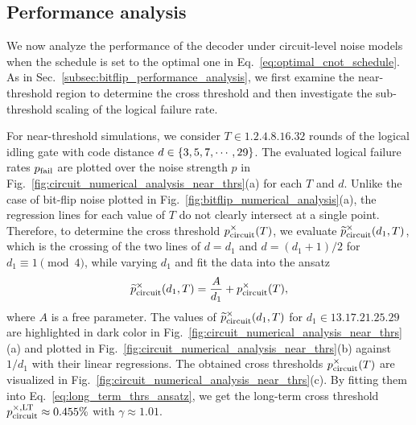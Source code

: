 \documentclass[a4paper,twocolumn,11pt,accepted=2025-01-21]{quantumarticle}
\theoremstyle{definition}
\theoremstyle{definition}
\theoremstyle{definition}
\begin{document}
\subsection{Performance analysis}

We now analyze the performance of the decoder under circuit-level noise models when the \cnot schedule is set to the optimal one in Eq.~\eqref{eq:optimal_cnot_schedule}.
As in Sec.~\ref{subsec:bitflip_performance_analysis}, we first examine the near-threshold region to determine the cross threshold and then investigate the sub-threshold scaling of the logical failure rate.

For near-threshold simulations, we consider $T \in \qty{1, 2, 4, 8, 16, 32}$ rounds of the logical idling gate with code distance $d \in \qty{3, 5, 7, \cdots, 29}$.
The evaluated logical failure rates $p_{\mathrm{fail}}$ are plotted over the noise strength $p$ in Fig.~\ref{fig:circuit_numerical_analysis_near_thrs}(a) for each $T$ and $d$.
Unlike the case of bit-flip noise plotted in Fig.~\ref{fig:bitflip_numerical_analysis}(a), the regression lines for each value of $T$ do not clearly intersect at a single point.
Therefore, to determine the cross threshold $p^\times_{\mathrm{circuit}}(T)$, we evaluate $\widetilde{p}^\times_{\mathrm{circuit}} (d_1, T)$, which is the crossing of the two lines of $d = d_1$ and $d = (d_1 + 1)/2$ for $d_1 \equiv 1 \pmod{4}$, while varying $d_1$ and fit the data into the ansatz
\begin{align*}
    \widetilde{p}^\times_{\mathrm{circuit}} (d_1, T) = \frac{A}{d_1} + p^\times_{\mathrm{circuit}}(T),
\end{align*}
where $A$ is a free parameter.
The values of $\widetilde{p}^\times_{\mathrm{circuit}} (d_1, T)$ for $d_1 \in \qty{13, 17, 21, 25, 29}$ are highlighted in dark color in Fig.~\ref{fig:circuit_numerical_analysis_near_thrs}(a) and plotted in Fig.~\ref{fig:circuit_numerical_analysis_near_thrs}(b) against $1/d_1$ with their linear regressions.
The obtained cross thresholds $p^\times_{\mathrm{circuit}}(T)$ are visualized in Fig.~\ref{fig:circuit_numerical_analysis_near_thrs}(c).
By fitting them into Eq.~\eqref{eq:long_term_thrs_ansatz}, we get the long-term cross threshold $p^{\times,\mathrm{LT}}_{\mathrm{circuit}} \approx 0.455\%$ with $\gamma \approx 1.01$.
\end{document}
